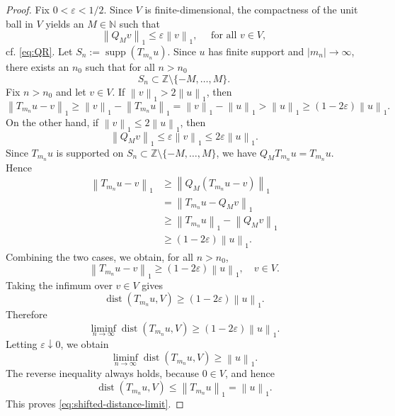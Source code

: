 \documentclass[reqno,a4paper,12pt]{amsart}
\numberwithin{equation}{section}
\def\N{{\mathbb N}}
\def\Z{{\mathbb Z}}
\newcommand\1{\mathds{1}}
\newcommand{\norm}[1]{\left\lVert #1 \right\rVert}
\newcommand{\abs}[1]{\left\lvert #1 \right\rvert}
\newcommand{\dist}{\operatorname{dist}}
\begin{document}
\begin{proof}
Fix $0<\varepsilon<1/2$. Since $V$ is finite-dimensional, the compactness of the unit ball in $V$
yields an $M\in\N$ such that
\begin{equation}\label{eq:kernel-tail-small}
\norm{Q_M v}_1\le \varepsilon\norm{v}_1,
\quad \text{ for all }  v\in V,
\end{equation}
cf. \eqref{eq:QR}.
Let $S_n:=\operatorname{supp}(T_{m_n}u)$. Since $u$ has finite support and
$\abs{m_n}\to\infty$, there exists an $n_0$ such that for all $n>n_0$
\begin{equation}\label{eq:shifted-support-away}
S_n\subset \Z\setminus\{-M,\ldots,M\}.
\end{equation}
Fix $n>n_0$ and let $v\in V$. If $\norm{v}_1>2\norm{u}_1$, then
\begin{equation}\label{eq:large-kernel-vector-distance}
\norm{T_{m_n}u-v}_1
\ge
\norm{v}_1-\norm{T_{m_n}u}_1
=
\norm{v}_1-\norm{u}_1
>
\norm{u}_1
\ge
(1-2\varepsilon)\norm{u}_1.
\end{equation}
On the other hand, if $\norm{v}_1\le 2\norm{u}_1$, then
$$
\norm{Q_M v}_1
\le
\varepsilon\norm{v}_1
\le
2\varepsilon\norm{u}_1.
$$
Since $T_{m_n}u$ is supported on
$S_n\subset\Z\setminus\{-M,\ldots,M\}$, we have
$Q_MT_{m_n}u=T_{m_n}u$. Hence
\begin{equation}\label{eq:small-kernel-vector-distance}
\begin{aligned}
\norm{T_{m_n}u-v}_1
&\ge
\norm{Q_M(T_{m_n}u-v)}_1 \\
&=
\norm{T_{m_n}u-Q_Mv}_1 \\
&\ge
\norm{T_{m_n}u}_1-\norm{Q_Mv}_1 \\
&\ge
(1-2\varepsilon)\norm{u}_1 .
\end{aligned}
\end{equation}
Combining the two cases, we obtain, for all $n>n_0$,
$$
\norm{T_{m_n}u-v}_1
\ge
(1-2\varepsilon)\norm{u}_1,
\quad v\in V.
$$
Taking the infimum over $v\in V$ gives
$$
\dist(T_{m_n}u,V)
\ge
(1-2\varepsilon)\norm{u}_1.
$$
Therefore
$$
\liminf_{n\to\infty}\dist(T_{m_n}u,V)
\ge
(1-2\varepsilon)\norm{u}_1.
$$
Letting $\varepsilon\downarrow0$, we obtain
$$
\liminf_{n\to\infty}\dist(T_{m_n}u,V)\ge \norm{u}_1.
$$
The reverse inequality always holds,  because $0\in V$, and hence
$$
\dist(T_{m_n}u,V)
\le
\norm{T_{m_n}u}_1
=
\norm{u}_1.
$$
This proves \eqref{eq:shifted-distance-limit}.


\end{proof}
\end{document}
